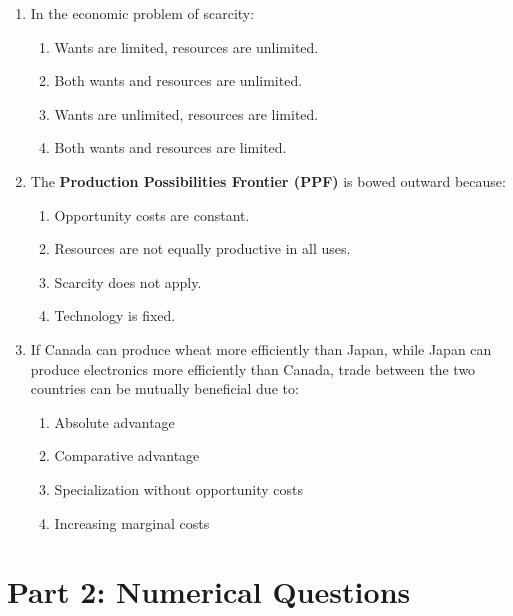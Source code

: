 \documentclass[12pt]{article}
\begin{document}
\begin{enumerate}
    \item In the economic problem of scarcity:  
    \begin{enumerate}[label=\Alph*.]
        \item Wants are limited, resources are unlimited.  
        \item Both wants and resources are unlimited.  
        \item Wants are unlimited, resources are limited.  
        \item Both wants and resources are limited.  
    \end{enumerate}
\newpage
    \item The \textbf{Production Possibilities Frontier (PPF)} is bowed outward because:
    \begin{enumerate}[label=\Alph*.]
        \item Opportunity costs are constant.  
        \item Resources are not equally productive in all uses.  
        \item Scarcity does not apply.  
        \item Technology is fixed.  
    \end{enumerate}

    \item If Canada can produce wheat more efficiently than Japan, while Japan can produce electronics more efficiently than Canada, trade between the two countries can be mutually beneficial due to:
    \begin{enumerate}[label=\Alph*.]
        \item Absolute advantage  
        \item Comparative advantage  
        \item Specialization without opportunity costs  
        \item Increasing marginal costs  
    \end{enumerate}
\end{enumerate}



\section*{Part 2: Numerical Questions}
\end{document}
